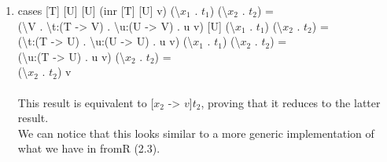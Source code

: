 \documentclass[a4paper]{article}
\begin{document}
\begin{enumerate}
  \item cases [T] [U] [U] (inr [T] [U] v) (\textbackslash $x_1$ . $t_1$) (\textbackslash $x_2$ . $t_2$) = \\
    (\textbackslash V . \textbackslash t:(T -> V) . \textbackslash u:(U -> V) . u v) [U] (\textbackslash $x_1$ . $t_1$) (\textbackslash $x_2$ . $t_2$) = \\
    (\textbackslash t:(T -> U) . \textbackslash u:(U -> U) . u v) (\textbackslash $x_1$ . $t_1$) (\textbackslash $x_2$ . $t_2$) = \\
    (\textbackslash u:(T -> U) . u v) (\textbackslash $x_2$ . $t_2$) = \\
    (\textbackslash $x_2$ . $t_2$) v \\\\
    This result is equivalent to [$x_2$ -> $v$]$t_2$, proving that it reduces to the latter result.\\
    We can notice that this looks similar to a more generic implementation of what we have in fromR (2.3).
\end{enumerate}
\end{document}
